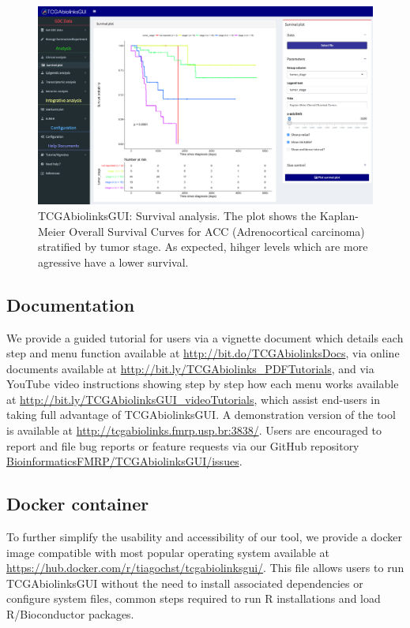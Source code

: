 \begin{figure}[]
\includegraphics[width=1.0\linewidth]{images/gui_acc_survival.png}
\caption[TCGAbiolinksGUI: Survival analysis]{TCGAbiolinksGUI: Survival analysis.
The plot shows the Kaplan-Meier Overall Survival Curves for ACC (Adrenocortical carcinoma) stratified by tumor stage.
As expected, hihger levels which are more agressive have a lower survival.}
\label{fig:gui_survival}
\end{figure}

\subsection{Documentation}

We provide a guided tutorial for users via a vignette document which details each step and menu function available at \href{http://bit.do/TCGAbiolinksDocs}{http://bit.do/TCGAbiolinksDocs}, via online documents available at
\href{http://bit.ly/TCGAbiolinks\_PDFTutorials}{http://bit.ly/TCGAbiolinks\_PDFTutorials}, and via YouTube video instructions showing step by step how each menu works available at \href{http://bit.ly/TCGAbiolinksGUI\_videoTutorials}{http://bit.ly/TCGAbiolinksGUI\_videoTutorials}, which assist end-users in taking full advantage of TCGAbiolinksGUI. A demonstration version of the tool is available at \href{http://tcgabiolinks.fmrp.usp.br:3838/}{http://tcgabiolinks.fmrp.usp.br:3838/}. Users are encouraged to report and file bug reports or feature requests via our GitHub repository \href{https://github.com/BioinformaticsFMRP/TCGAbiolinksGUI/issues}{BioinformaticsFMRP/TCGAbiolinksGUI/issues}.

\subsection{Docker container}
To further simplify the usability and accessibility of our tool, we provide a docker image compatible with most popular operating system available at \\
\href{https://hub.docker.com/r/tiagochst/tcgabiolinksgui/}{https://hub.docker.com/r/tiagochst/tcgabiolinksgui/}. This file allows users to run TCGAbiolinksGUI without the need to install associated dependencies or configure system files, common steps required to run R installations and load R/Bioconductor packages.

